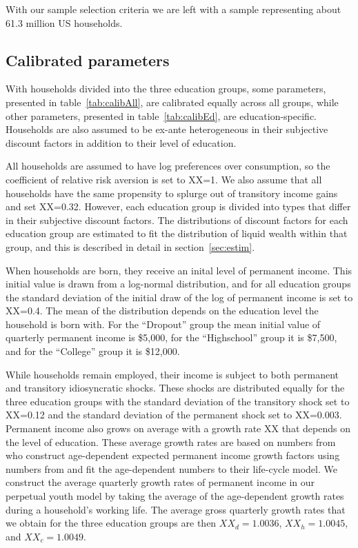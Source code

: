 \documentclass[11pt]{article}
\begin{document}
With our sample selection criteria we are left with a sample representing about 61.3 million US households.

\subsection{Calibrated parameters} 

With households divided into the three education groups, some parameters, presented in table~\ref{tab:calibAll}, are calibrated equally across all groups, while other parameters, presented in table~\ref{tab:calibEd}, are education-specific. Households are also assumed to be ex-ante heterogeneous in their subjective discount factors in addition to their level of education. 

All households are assumed to have log preferences over consumption, so the coefficient of relative risk aversion is set to XX=1. We also assume that all households have the same propensity to splurge out of transitory income gains and set XX=0.32. However, each education group is divided into types that differ in their subjective discount factors. The distributions of discount factors for each education group are estimated to fit the distribution of liquid wealth within that group, and this is described in detail in section~\ref{sec:estim}. 

When households are born, they receive an inital level of permanent income. This initial value is drawn from a log-normal distribution, and for all education groups the standard deviation of the initial draw of the log of permanent income is set to XX=0.4. The mean of the distribution depends on the education level the household is born with. For the ``Dropout'' group the mean initial value of quarterly permanent income is \$5,000, for the ``Highschool'' group it is \$7,500, and for the ``College'' group it is \$12,000. 

While households remain employed, their income is subject to both permanent and transitory idiosyncratic shocks. These shocks are distributed equally for the three education groups with the standard deviation of the transitory shock set to XX=0.12 and the standard deviation of the permanent shock set to XX=0.003. Permanent income also grows on average with a growth rate XX that depends on the level of education. These average growth rates are based on numbers from \citet{carroll2020modeling} who construct age-dependent expected permanent income growth factors using numbers from \citet{cagetti2003wealth} and fit the age-dependent numbers to their life-cycle model. We construct the average quarterly growth rates of permanent income in our perpetual youth model by taking the average of the age-dependent growth rates during a household's working life. The average gross quarterly growth rates that we obtain for the three education groups are then $XX_d=1.0036$, $XX_h=1.0045$, and $XX_c=1.0049$.
\end{document}
